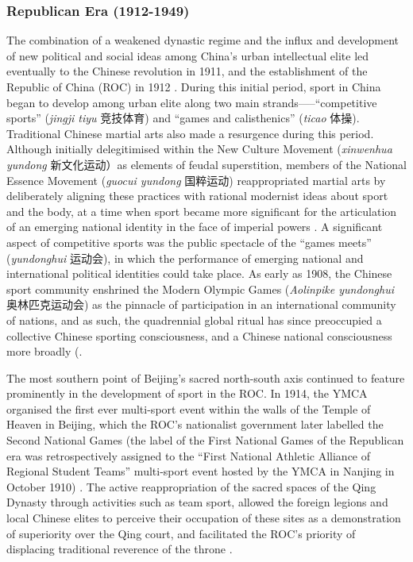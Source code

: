 \begin{CJK}{UTF8}{gbsn}
\subsubsection{Republican Era (1912-1949)}
The combination of a weakened dynastic regime and the influx and development of new political and social ideas among China's urban intellectual elite led eventually to the Chinese revolution in 1911, and the establishment of the Republic of China (ROC) in 1912 \citep{Mitter2008}. During this initial period, sport in China began to develop among urban elite along two main strands—--``competitive sports'' (\textit{jingji tiyu} 竞技体育) and ``games and calisthenics'' (\textit{ticao} 体操).  Traditional Chinese martial arts also made a resurgence during this period.  Although initially delegitimised within the New Culture Movement (\textit{xinwenhua yundong} 新文化运动）as elements of feudal superstition, members of the National Essence Movement (\textit{guocui yundong} 国粹运动) reappropriated martial arts by deliberately aligning these practices with rational modernist ideas about sport and the body, at a time when sport became more significant for the articulation of an emerging national identity in the face of imperial powers \citep[38]{Brownell1995}\citep[45]{Morris2004}.  A significant aspect of competitive sports was the public spectacle of the ``games meets'' (\textit{yundonghui} 运动会), in which the performance of emerging national and international political identities could take place.  As early as 1908, the Chinese sport community enshrined the Modern Olympic Games (\textit{Aolinpike yundonghui} 奥林匹克运动会) as the pinnacle of participation in an international community of nations, and as such, the quadrennial global ritual has since preoccupied a collective Chinese sporting consciousness, and a Chinese national consciousness more broadly (\citep{Jarvie2008;Barme2009;Brownell2008;Morris2004;Xu2008}.

The most southern point of Beijing's sacred north-south axis continued to feature prominently in the development of sport in the ROC.  In 1914, the YMCA organised the first ever multi-sport event within the walls of the Temple of Heaven in Beijing, which the ROC's nationalist government later labelled the Second National Games (the label of the First National Games of the Republican era was retrospectively assigned to the ``First National Athletic Alliance of Regional Student Teams'' multi-sport event hosted by the YMCA in Nanjing in October 1910) \citep[441]{Li2015}. The active reappropriation of the sacred spaces of the Qing Dynasty through activities such as team sport, allowed the foreign legions and local Chinese elites to perceive their occupation of these sites as a demonstration of superiority over the Qing court, and facilitated the ROC's priority of displacing traditional reverence of the throne \citep{Hevia1990}.


\end{CJK}
